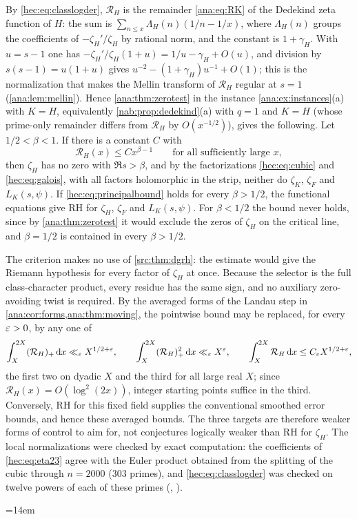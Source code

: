 \begin{example}\label{hec:thm:principal}
By \eqref{hec:eq:classlogder}, $\mathcal R_H$ is the remainder \eqref{ana:eq:RK} of the Dedekind zeta
function of $H$: the sum is $\sum_{n\le x}\Lambda_H(n)(1/n-1/x)$, where $\Lambda_H(n)$ groups the
coefficients of $-\zeta_H'/\zeta_H$ by rational norm, and the constant is $1+\gamma_H$. With $u=s-1$ one has
$-\zeta_H'/\zeta_H(1+u)=1/u-\gamma_H+O(u)$, and division by $s(s-1)=u(1+u)$ gives
$u^{-2}-(1+\gamma_H)u^{-1}+O(1)$; this is the normalization that makes the Mellin transform of
$\mathcal R_H$ regular at $s=1$ (\cref{ana:lem:mellin}). Hence \cref{ana:thm:zerotest} in the instance
\cref{ana:ex:instances}(a) with $K=H$, equivalently \cref{nab:prop:dedekind}(a) with $q=1$ and $K=H$
(whose prime-only remainder differs from $\mathcal R_H$ by $O(x^{-1/2})$), gives the following. Let
$1/2<\beta<1$. If there is a constant $C$ with
\begin{equation}\label{hec:eq:principalbound}
\mathcal R_H(x)\le Cx^{\beta-1}\qquad\text{for all sufficiently large }x,
\end{equation}
then $\zeta_H$ has no zero with $\Re s>\beta$, and by the factorizations \eqref{hec:eq:cubic} and
\eqref{hec:eq:galois}, with all factors holomorphic in the strip, neither do $\zeta_K$, $\zeta_F$ and
$L_K(s,\psi)$. If \eqref{hec:eq:principalbound} holds for every $\beta>1/2$, the functional equations give
RH for $\zeta_H$, $\zeta_F$ and $L_K(s,\psi)$. For $\beta<1/2$ the bound never holds, since by
\cref{ana:thm:zerotest} it would exclude the zeros of $\zeta_H$ on the critical line, and $\beta=1/2$ is
contained in every $\beta>1/2$.
\end{example}

The criterion makes no use of \cref{src:thm:dgrh}: the estimate would give the Riemann hypothesis for every
factor of $\zeta_H$ at once. Because the selector is the full class-character product, every residue has the same
sign, and no auxiliary zero-avoiding twist is required. By the averaged forms of the Landau step in
\cref{ana:cor:forms,ana:thm:moving}, the pointwise bound may be replaced, for every $\varepsilon>0$, by any one of
\[
 \int_X^{2X}(\mathcal R_H)_+\,\mathrm{d} x\ll_\varepsilon X^{1/2+\varepsilon},\qquad
 \int_X^{2X}(\mathcal R_H)_+^2\,\mathrm{d} x\ll_\varepsilon X^{\varepsilon},\qquad
 \int_X^{2X}\mathcal R_H\,\mathrm{d} x\le C_\varepsilon X^{1/2+\varepsilon},
\]
the first two on dyadic $X$ and the third for all large real $X$; since
$\mathcal R_H(x)=O(\log^2(2x))$, integer starting points suffice in the third. Conversely, RH for this
fixed field supplies the conventional smoothed error bounds, and hence these averaged bounds. The three
targets are therefore weaker forms of control to aim for, not conjectures logically weaker than RH for
$\zeta_H$. The local normalizations
were checked by exact computation: the coefficients of \eqref{hec:eq:eta23} agree with the Euler product
obtained from the splitting of the cubic through $n=2000$ (303 primes), and \eqref{hec:eq:classlogder} was
checked on twelve powers of each of these primes
(,
).
{\emergencystretch=14em\par}

